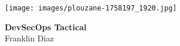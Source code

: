 \begin{titlepage}
    \centering
    \vspace{0mm}
    \texttt{[image: images/plouzane-1758197\_1920.jpg]}
    \vspace*{40mm} %
    \begin{flushright}
        \textbf{\Huge {DevSecOps Tactical}}\\
        \vspace{5mm}
        \Large \textsf{Franklin Diaz}\\
        \vspace*{0mm}
    \end{flushright}
    \clearpage
    \vspace*{\fill}
\end{titlepage}
